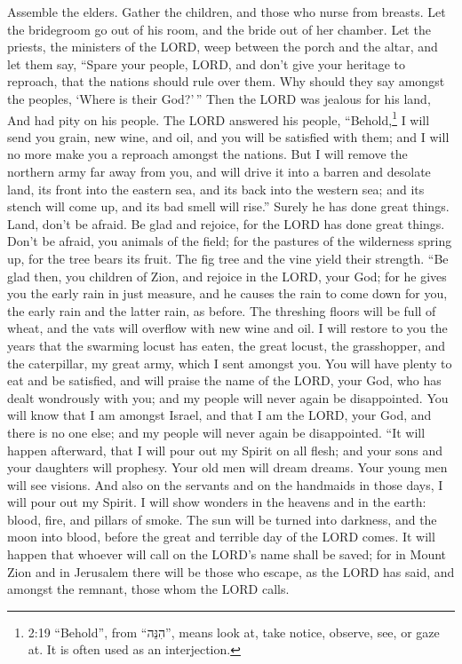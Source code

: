 Assemble the elders. Gather the children, and those who nurse from
breasts. Let the bridegroom go out of his room, and the bride out of her
chamber.  Let the priests, the ministers of the LORD, weep
between the porch and the altar, and let them say, ``Spare your people,
LORD, and don't give your heritage to reproach, that the nations should
rule over them. Why should they say amongst the peoples, `Where is their
God?'\,''  Then the LORD was jealous for his land, And had
pity on his people.  The LORD answered his people,
``Behold,\footnote{2:19 ``Behold'', from ``הִנֵּה'', means look at, take
  notice, observe, see, or gaze at. It is often used as an interjection.}
I will send you grain, new wine, and oil, and you will be satisfied with
them; and I will no more make you a reproach amongst the nations.
 But I will remove the northern army far away from you, and
will drive it into a barren and desolate land, its front into the
eastern sea, and its back into the western sea; and its stench will come
up, and its bad smell will rise.'' Surely he has done great things.
 Land, don't be afraid. Be glad and rejoice, for the LORD
has done great things.  Don't be afraid, you animals of the
field; for the pastures of the wilderness spring up, for the tree bears
its fruit. The fig tree and the vine yield their strength. 
``Be glad then, you children of Zion, and rejoice in the LORD, your God;
for he gives you the early rain in just measure, and he causes the rain
to come down for you, the early rain and the latter rain, as before.
 The threshing floors will be full of wheat, and the vats
will overflow with new wine and oil.  I will restore to you
the years that the swarming locust has eaten, the great locust, the
grasshopper, and the caterpillar, my great army, which I sent amongst
you.  You will have plenty to eat and be satisfied, and
will praise the name of the LORD, your God, who has dealt wondrously
with you; and my people will never again be disappointed. 
You will know that I am amongst Israel, and that I am the LORD, your
God, and there is no one else; and my people will never again be
disappointed.  ``It will happen afterward, that I will pour
out my Spirit on all flesh; and your sons and your daughters will
prophesy. Your old men will dream dreams. Your young men will see
visions.  And also on the servants and on the handmaids in
those days, I will pour out my Spirit.  I will show wonders
in the heavens and in the earth: blood, fire, and pillars of smoke.
 The sun will be turned into darkness, and the moon into
blood, before the great and terrible day of the LORD comes.
 It will happen that whoever will call on the LORD's name
shall be saved; for in Mount Zion and in Jerusalem there will be those
who escape, as the LORD has said, and amongst the remnant, those whom
the LORD calls.

